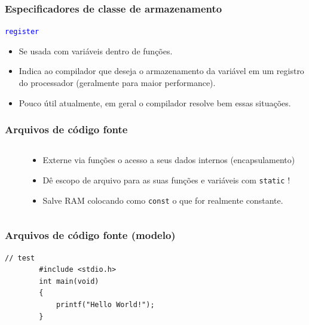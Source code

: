 \documentclass{beamer}
\begin{document}
\begin{frame}
	\frametitle{Especificadores de classe de armazenamento}
	\begin{center}
		\texttt{\textcolor{blue}{register}}
	\end{center}
	\vspace*{0.5cm}
	\begin{itemize}
		\item Se usada com variáveis dentro de funções.
		\item Indica ao compilador que deseja o armazenamento da variável em um registro do processador (geralmente para maior performance).
		\item Pouco útil atualmente, em geral o compilador resolve bem essas situações.
	\end{itemize}
\end{frame}

\begin{frame}
	\frametitle{Arquivos de código fonte}
	\begin{columns}[T] %
		\begin{column}{.60\textwidth}
			
		\end{column}%
		\hfill%
		\begin{column}{.40\textwidth}
			\begin{itemize}
				\item Externe via funções o acesso a seus dados internos (encapsulamento)
				\item Dê escopo de arquivo para as suas funções e variáveis com \texttt{static} !
				\item Salve RAM colocando como \texttt{const} o que for realmente constante.
			\end{itemize}
		\end{column}%
	\end{columns}
\end{frame}

\begin{frame}
	\frametitle{Arquivos de código fonte (modelo)}
	
\end{frame}


\begin{frame}[fragile]
	\begin{lstlisting}[style=customc]
		// test
		#include <stdio.h>
		int main(void)
		{
			printf("Hello World!");
		}
	\end{lstlisting}
\end{frame}
\end{document}
